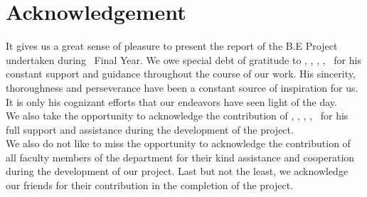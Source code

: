
  
\chapter*{Acknowledgement}
%

It gives us a great sense of pleasure to present the report of the B.E Project undertaken during \degree \ Final Year. We owe special debt of gratitude to \guide, \guidedes, \dept, \college, \collegeplace \ for his constant support and  guidance throughout the course of our work. His sincerity, thoroughness and perseverance have been a constant source of inspiration for us. It is only his cognizant efforts that our endeavors have seen light of the day. \\

We also take the opportunity to acknowledge the contribution of \hod, \hoddes, \dept, \college, \collegeplace \ for his full support and assistance during the development of the project. \\

We also do not like to miss the opportunity to acknowledge the contribution of all faculty members of the department for their kind assistance and cooperation during the development of our project. Last but not the least, we acknowledge our friends for their contribution in the completion of the project. \\

\vspace*{120pt}
\begin{flushright}
	\textbf{\studentA}\\
	\textbf{\studentB}\\
	\textbf{\studentC}\\
	\textbf{\studentD}\\
\end{flushright}
\thispagestyle{plain}
